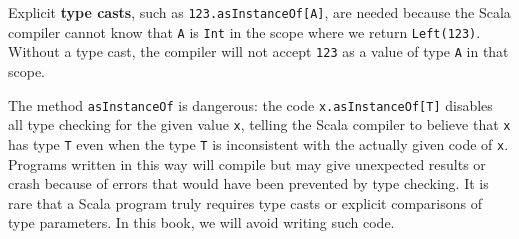 Explicit \textbf{type casts}, such as \lstinline!123.asInstanceOf[A]!,
are needed because the Scala compiler cannot know that \lstinline!A!
is \lstinline!Int! in the scope where we return \lstinline!Left(123)!.
Without a type cast, the compiler will not accept \lstinline!123!
as a value of type \lstinline!A! in that scope.

The method \lstinline!asInstanceOf! is dangerous: the code \lstinline!x.asInstanceOf[T]!
disables all type checking for the given value \lstinline!x!, telling
the Scala compiler to believe that \lstinline!x! has type \lstinline!T!
even when the type \lstinline!T! is inconsistent with the actually
given code of \lstinline!x!. Programs written in this way will compile
but may give unexpected results or crash because of errors that would
have been prevented by type checking. It is rare that a Scala program
truly requires type casts or explicit comparisons of type parameters.
In this book, we will avoid writing such code.
